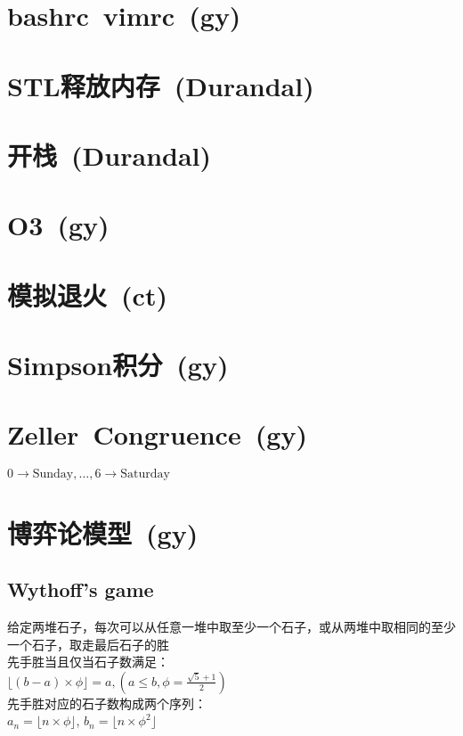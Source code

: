 \section{bashrc\ vimrc\ \small(gy)}
    \hline
\section{STL释放内存\ \small(Durandal)}
\section{开栈\ \small(Durandal)}
\section{O3\ \small(gy)}
\section{模拟退火\ \small(ct)}
\section{Simpson积分\ \small(gy)}
\section{Zeller\ Congruence\ \small(gy)}
    $ 0 \to \text{Sunday} , \dots , 6 \to \text{Saturday} $
\section{博弈论模型\ \small(gy)}
    \subsection*{Wythoff's game}
        给定两堆石子，每次可以从任意一堆中取至少一个石子，或从两堆中取相同的至少一个石子，取走最后石子的胜
        \\先手胜当且仅当石子数满足：
        \\$\lfloor (b - a) \times \phi \rfloor=a, (a \leq b, \phi = \frac{\sqrt{5} + 1}{2})$
        \\先手胜对应的石子数构成两个序列：
        \\$a_n = \lfloor n \times \phi \rfloor$, $b_n = \lfloor n \times \phi ^ 2 \rfloor$
